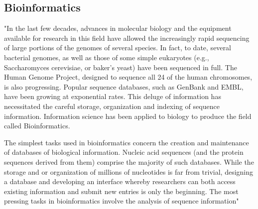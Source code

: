 \subsection{Bioinformatics}
\label{sec:bioinformatics}

"In the last few decades, advances in molecular biology and the equipment available for research in this field have allowed the increasingly rapid sequencing of large portions of the genomes of several species. In fact, to date, several bacterial genomes, as well as those of some simple eukaryotes (e.g., Saccharomyces cerevisiae, or baker's yeast) have been sequenced in full. The Human Genome Project, designed to sequence all 24 of the human chromosomes, is also progressing. Popular sequence databases, such as GenBank and EMBL, have been growing at exponential rates. This deluge of information has necessitated the careful storage, organization and indexing of sequence information. Information science has been applied to biology to produce the field called Bioinformatics.


The simplest tasks used in bioinformatics concern the creation and maintenance of databases of biological information. Nucleic acid sequences (and the protein sequences derived from them) comprise the majority of such databases. While the storage and or organization of millions of nucleotides is far from trivial, designing a database and developing an interface whereby researchers can both access existing information and submit new entries is only the beginning. The most pressing tasks in bioinformatics involve the analysis of sequence information"~\cite{Biology}


